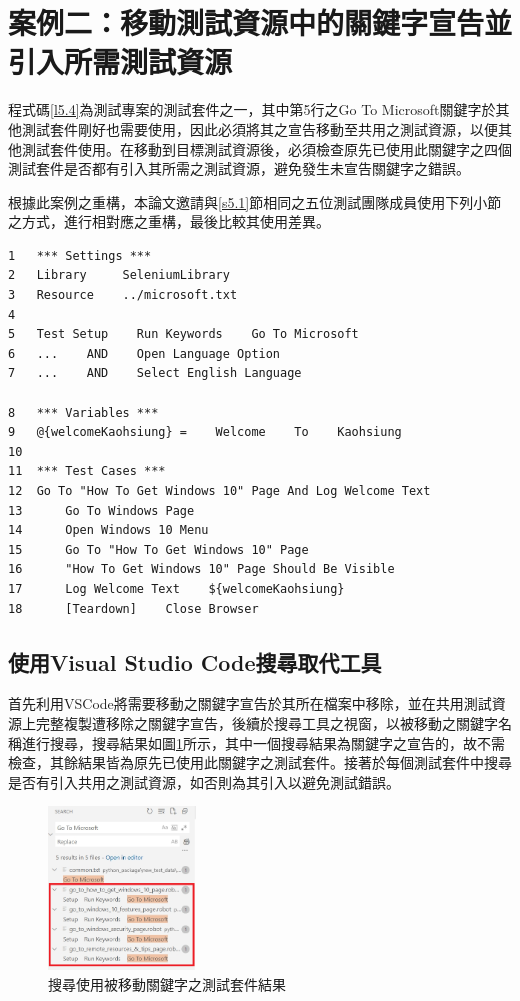 \section{案例二：移動測試資源中的關鍵字宣告並引入所需測試資源}\label{s5.2}
\indent
程式碼\ref{l5.4}為測試專案的測試套件之一，其中第5行之Go To Microsoft關鍵字於其他測試套件剛好也需要使用，因此必須將其之宣告移動至共用之測試資源，以便其他測試套件使用。在移動到目標測試資源後，必須檢查原先已使用此關鍵字之四個測試套件是否都有引入其所需之測試資源，避免發生未宣告關鍵字之錯誤。

\indent
根據此案例之重構，本論文邀請與\ref{s5.1}節相同之五位測試團隊成員使用下列小節之方式，進行相對應之重構，最後比較其使用差異。

\begin{lstlisting}[caption=前往如何取得Windows10頁面之測試套件, label={l5.4}]
1   *** Settings ***
2   Library     SeleniumLibrary
3   Resource    ../microsoft.txt
4
5   Test Setup    Run Keywords    Go To Microsoft
6   ...    AND    Open Language Option
7   ...    AND    Select English Language

8   *** Variables ***
9   @{welcomeKaohsiung} =    Welcome    To    Kaohsiung
10
11  *** Test Cases ***
12  Go To "How To Get Windows 10" Page And Log Welcome Text
13      Go To Windows Page
14      Open Windows 10 Menu
15      Go To "How To Get Windows 10" Page
16      "How To Get Windows 10" Page Should Be Visible
17      Log Welcome Text    ${welcomeKaohsiung}
18      [Teardown]    Close Browser
\end{lstlisting}

\subsection{使用Visual Studio Code搜尋取代工具}
\indent
首先利用VSCode將需要移動之關鍵字宣告於其所在檔案中移除，並在共用測試資源上完整複製遭移除之關鍵字宣告，後續於搜尋工具之視窗，以被移動之關鍵字名稱進行搜尋，搜尋結果如圖\ref{f5.9}所示，其中一個搜尋結果為關鍵字之宣告的，故不需檢查，其餘結果皆為原先已使用此關鍵字之測試套件。接著於每個測試套件中搜尋是否有引入共用之測試資源，如否則為其引入以避免測試錯誤。

\begin{figure}[H]
    \centering
    \includegraphics[width=0.35\textwidth]{picture/ch5/Search_using_keyword_in_case2.png}
    \caption{搜尋使用被移動關鍵字之測試套件結果}
    \label{f5.9}
\end{figure}

